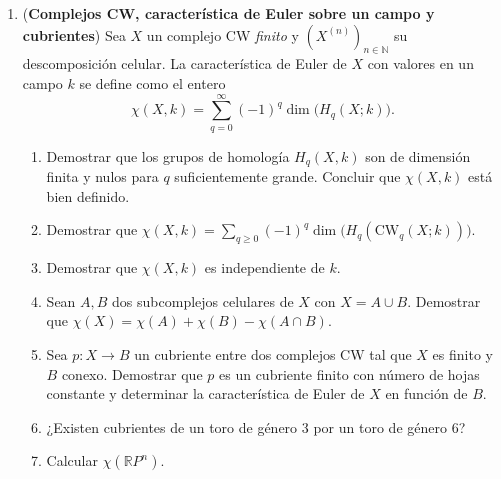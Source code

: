 \documentclass[11pt,a4paper]{article}
\theoremstyle{plain}
\theoremstyle{definition}
\theoremstyle{remark}
\newcommand{\RR}{\mathbb R}
\newcommand{\NN}{\mathbb N}
\newcommand{\CWq}{\mathrm{CW}}
\begin{document}
\begin{enumerate}[label=\arabic*.,leftmargin=*]
\item (\textbf{Complejos CW, característica de Euler sobre un campo y
cubrientes}) Sea $X$ un complejo CW \emph{finito} y $(X^{(n)})_{n\in\NN}$
su descomposición celular. La característica de Euler de $X$ con valores
en un campo $k$ se define como el entero
\[
\chi(X,k)=\sum_{q=0}^\infty(-1)^q\dim\big(H_q(X;k)\big).
\]
\begin{enumerate}[label=\alph*)]
\item Demostrar que los grupos de homología $H_q(X,k)$ son de dimensión
finita y nulos para $q$ suficientemente grande. Concluir que $\chi(X,k)$
está bien definido.
\item Demostrar que
$\chi(X,k)=\sum_{q\ge0}(-1)^q\dim\big(H_q(\CWq_q(X;k))\big)$.
\item Demostrar que $\chi(X,k)$ es independiente de $k$.
\item Sean $A,B$ dos subcomplejos celulares de $X$ con $X=A\cup B$.
Demostrar que $\chi(X)=\chi(A)+\chi(B)-\chi(A\cap B)$.
\item Sea $p:X\to B$ un cubriente entre dos complejos CW tal que $X$ es
finito y $B$ conexo. Demostrar que $p$ es un cubriente finito con número
de hojas constante y determinar la característica de Euler de $X$ en
función de $B$.
\item ¿Existen cubrientes de un toro de género $3$ por un toro de género
$6$?
\item Calcular $\chi(\RR P^n)$.
\end{enumerate}


\end{enumerate}
\end{document}
